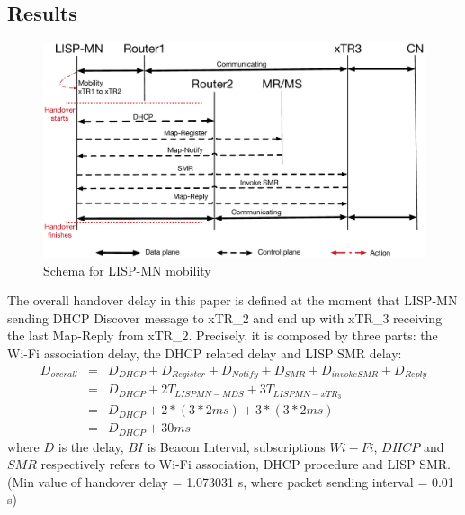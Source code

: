 \subsection{Results}
\label{sec:ns3_results_lispmn}

\begin{figure}[!th]
	\centering
	\includegraphics[width=\textwidth]{Pics/Mobility_LISPMN_schema_SMR_simplify}
	\caption{Schema for LISP-MN mobility}
	\label{sim_schema}
\end{figure}

The overall handover delay in this paper is defined at the moment that LISP-MN sending DHCP Discover message to xTR\_2 and end up with xTR\_3 receiving the last Map-Reply from xTR\_2. Precisely, it is composed by three parts: the Wi-Fi association delay, the DHCP related delay and LISP SMR delay:
\begin{eqnarray}
	D_{overall} &=& D_{DHCP} + D_{Register} + D_{Notify} + D_{SMR} + D_{invokeSMR} + D_{Reply} \nonumber \\
	&=& D_{DHCP} + 2T_{LISPMN-MDS} + 3T_{LISPMN-xTR_3} \nonumber \\
	&=& D_{DHCP} + 2* (3*2ms) + 3*(3*2ms)\nonumber \\
	&=& D_{DHCP} + 30 ms
\end{eqnarray}
where $D$ is the delay, $BI$ is Beacon Interval, subscriptions $Wi-Fi$, $DHCP$ and $SMR$ respectively refers to Wi-Fi association, DHCP procedure and LISP SMR. (Min value of handover delay = 1.073031 s, where packet sending interval = 0.01 s) 

